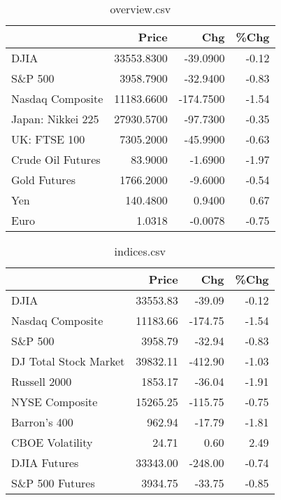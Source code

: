 \documentclass{article}%
\begin{document}
\begin{table}[htbp]%
\caption{overview.csv}%
\centering%
\begin{adjustbox}{width=1\textwidth}%
\begin{tabular}{lrrr}
\toprule
                  &      Price &       Chg &  \%Chg \\
\midrule
             DJIA & 33553.8300 &  -39.0900 & -0.12 \\
          S\&P 500 &  3958.7900 &  -32.9400 & -0.83 \\
 Nasdaq Composite & 11183.6600 & -174.7500 & -1.54 \\
Japan: Nikkei 225 & 27930.5700 &  -97.7300 & -0.35 \\
     UK: FTSE 100 &  7305.2000 &  -45.9900 & -0.63 \\
Crude Oil Futures &    83.9000 &   -1.6900 & -1.97 \\
     Gold Futures &  1766.2000 &   -9.6000 & -0.54 \\
              Yen &   140.4800 &    0.9400 &  0.67 \\
             Euro &     1.0318 &   -0.0078 & -0.75 \\
\bottomrule
\end{tabular}
%
\end{adjustbox}%
\end{table}

%


\begin{table}[htbp]%
\caption{indices.csv}%
\centering%
\begin{adjustbox}{width=1\textwidth}%
\begin{tabular}{lrrr}
\toprule
                      &    Price &     Chg &  \%Chg \\
\midrule
                 DJIA & 33553.83 &  -39.09 & -0.12 \\
     Nasdaq Composite & 11183.66 & -174.75 & -1.54 \\
              S\&P 500 &  3958.79 &  -32.94 & -0.83 \\
DJ Total Stock Market & 39832.11 & -412.90 & -1.03 \\
         Russell 2000 &  1853.17 &  -36.04 & -1.91 \\
       NYSE Composite & 15265.25 & -115.75 & -0.75 \\
         Barron's 400 &   962.94 &  -17.79 & -1.81 \\
      CBOE Volatility &    24.71 &    0.60 &  2.49 \\
         DJIA Futures & 33343.00 & -248.00 & -0.74 \\
      S\&P 500 Futures &  3934.75 &  -33.75 & -0.85 \\
\bottomrule
\end{tabular}
%
\end{adjustbox}%
\end{table}
\end{document}
